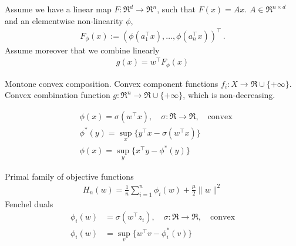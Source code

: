\documentclass{article}
\author{Thomas Hofmann}
\title{}
\begin{document}
\maketitle

Assume we have a linear map $F: \Re^d \to \Re^n$, such that $F(x) = A x$. $A \in \Re^{n \times d}$ and an elementwise non-linearity $\phi$,
\begin{align}
F_\phi(x) := ( \phi(a_1^\top x), \dots, \phi(a_n^\top x))^\top \,.
\end{align}
Assume moreover that we combine linearly 
\begin{align}
g(x) = w^\top F_\phi(x) 
\end{align}
\newpage
 


\noindent 
Montone convex composition. Convex component functions $f_i: X \to \Re \cup \{+\infty\}$. Convex combination function  $g: \Re^n \to \Re \cup \{+\infty\}$, which is non-decreasing. 

\newpage


\begin{align}
& \phi(x) = \sigma(w^\top x) , \quad \sigma: \Re \to \Re, \quad \text{convex}\\
& \phi^*(y) =\sup_{x} \{ y^\top x - \sigma(w^\top x)  \} \\
& \phi(x) = \sup_{y} \{ x^\top y - \phi^*(y) \}
\end{align}

\newpage

Primal family of objective functions
\begin{align}
H_n(w)  = \frac 1n \sum_{i=1}^n \phi_i(w) + \frac \mu 2 \| w\|^2
\end{align}
Fenchel duals
\begin{align}
\phi_i(w) & = \sigma(w^\top z_i), \quad \sigma: \Re \to \Re, \quad \text{convex}\\
\phi_i(w) & = \sup_{v}\{ w^\top v - \phi_i^*(v) \}
\end{align}
\end{document}
